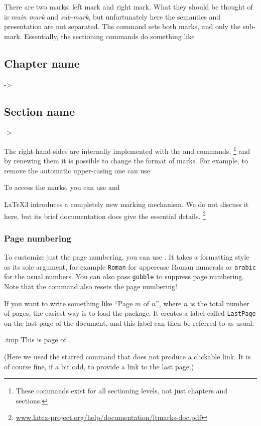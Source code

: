 There are two marks: left mark and right mark.
What they should be thought of is \emph{main mark} and \emph{sub-mark},
but unfortunately here the semantics and presentation are not separated.
The  command sets both marks, and  only the sub-mark.
Essentially, the sectioning commands do something like
%
\begin{ExampleCode}
\chapter{Chapter name} -> 
\section{Section name} -> 
\end{ExampleCode}
%
The right-hand-sides are internally implemented with the  and  commands,%
\footnote{These commands exist for all sectioning levels, not just chapters and sections.}
and by renewing them it is possible to change the format of marks.
For example, to remove the automatic upper-casing one can use
%
\begin{ExampleCode}
\renewcommand{\chaptermark}[1]{\markboth{\chaptername~\thechapter. #1}{}}
\renewcommand{\sectionmark}[1]{\markright{\thesection. #1}}
\end{ExampleCode}
%
To access the marks, you can use  and 


\begin{latexthree}
\LaTeX3 introduces a completely new marking mechanism.
We do not discuss it here, but its brief documentation does give the essential details.%
\footnote{\url{www.latex-project.org/help/documentation/ltmarks-doc.pdf}}
\end{latexthree}


%
%
\subsection{Page numbering}

To customize just the page numbering, you can use .
It takes a formatting style as its sole argument, for example \verb|Roman|
for uppercase Roman numerals or \verb|arabic| for the usual numbers.
You can also pass \verb|gobble| to suppress page numbering.
Note that the command also resets the page numbering!

If you want to write something like ``Page $m$ of $n$'', where $n$ is the total number of pages,
the easiest way is to load the  package.
It creates a label called \verb|LastPage| on the last page of the document,
and this label can then be referred to as usual:
%
\begin{VerbatimOut}{\jobname.tmp}
This is page
\thepage{} of \pageref*{LastPage}.
\end{VerbatimOut}
\ShowExample
%
(Here we used the starred  command that does not produce a clickable link.
It is of course fine, if a bit odd, to provide a link to the last page.)

